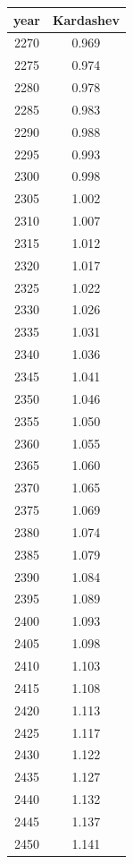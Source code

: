 \documentclass[a4paper]{article}
\begin{document}
	\begin{tabular}{|c|c|}
		\hline
		year & Kardashev \\
		\hline
		2270 & 0.969 \\
		\hline
		2275 & 0.974 \\
		\hline
		2280 & 0.978 \\
		\hline
		2285 & 0.983 \\
		\hline
		2290 & 0.988 \\
		\hline
		2295 & 0.993 \\
		\hline
		2300 & 0.998 \\
		\hline
		2305 & 1.002 \\
		\hline
		2310 & 1.007 \\
		\hline
		2315 & 1.012 \\
		\hline
		2320 & 1.017 \\
		\hline
		2325 & 1.022 \\
		\hline
		2330 & 1.026 \\
		\hline
		2335 & 1.031 \\
		\hline
		2340 & 1.036 \\
		\hline
		2345 & 1.041 \\
		\hline
		2350 & 1.046 \\
		\hline
		2355 & 1.050 \\
		\hline
		2360 & 1.055 \\
		\hline
		2365 & 1.060 \\
		\hline
		2370 & 1.065 \\
		\hline
		2375 & 1.069 \\
		\hline
		2380 & 1.074 \\
		\hline
		2385 & 1.079 \\
		\hline
		2390 & 1.084 \\
		\hline
		2395 & 1.089 \\
		\hline
		2400 & 1.093 \\
		\hline
		2405 & 1.098 \\
		\hline
		2410 & 1.103 \\
		\hline
		2415 & 1.108 \\
		\hline
		2420 & 1.113 \\
		\hline
		2425 & 1.117 \\
		\hline
		2430 & 1.122 \\
		\hline
		2435 & 1.127 \\
		\hline
		2440 & 1.132 \\
		\hline
		2445 & 1.137 \\
		\hline
		2450 & 1.141 \\

\end{tabular}
\end{document}
